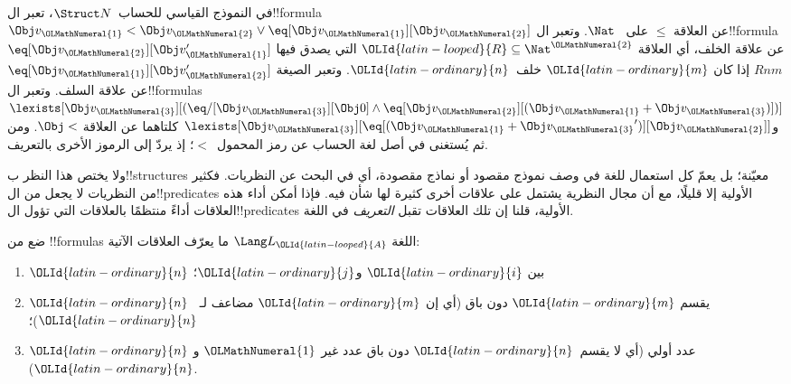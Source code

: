 \documentclass[../../../include/open-logic-section]{subfiles}
\begin{document}
\begin{ex}
في النموذج القياسي للحساب~$\Struct N$، تعبر ال!!{formula} $\Obj
v_{\OLMathNumeral{1}} < \Obj v_{\OLMathNumeral{2}} \lor \eq[\Obj v_{\OLMathNumeral{1}}][\Obj v_{\OLMathNumeral{2}}]$ عن العلاقة $\le$ على
~$\Nat$. وتعبر ال!!{formula} $\eq[\Obj v_{\OLMathNumeral{2}}][\Obj v_{\OLMathNumeral{1}}']$ عن علاقة
الخلف، أي العلاقة ${\OLId{latin-looped}{R}} \subseteq \Nat^{\OLMathNumeral{2}}$ التي يصدق فيها $Rnm$ إذا كان
${\OLId{latin-ordinary}{m}}$ خلف~${\OLId{latin-ordinary}{n}}$. وتعبر الصيغة $\eq[\Obj v_{\OLMathNumeral{1}}][\Obj v_{\OLMathNumeral{2}}']$ عن علاقة السلف.
وتعبر ال!!{formula}s $\lexists[\Obj v_{\OLMathNumeral{3}}][(\eq/[\Obj v_{\OLMathNumeral{3}}][\Obj 0] \land
  \eq[\Obj v_{\OLMathNumeral{2}}][(\Obj v_{\OLMathNumeral{1}} + \Obj v_{\OLMathNumeral{3}})])]$ و$\lexists[\Obj
  v_{\OLMathNumeral{3}}][\eq[(\Obj v_{\OLMathNumeral{1}} + {\Obj v_{\OLMathNumeral{3}}}')][\Obj v_{\OLMathNumeral{2}}]]$ كلتاهما عن العلاقة
$\Obj <$. ومن ثم يُستغنى في أصل لغة الحساب عن رمز المحمول~$<$؛
إذ يردّ إلى الرموز الأخرى بالتعريف.
\end{ex}

\begin{explain}
ولا يختص هذا النظر ب!!{structure}s معيّنة؛ بل يعمّ كل استعمال
للغة في وصف نموذج مقصود أو نماذج مقصودة، أي في البحث عن النظريات.
فكثير من النظريات لا يجعل من ال!!{predicate}s الأولية إلا قليلًا،
مع أن مجال النظرية يشتمل على علاقات أخرى كثيرة لها شأن فيه.
فإذا أمكن أداء هذه العلاقات أداءً منتظمًا بالعلاقات التي تؤول
ال!!{predicate}s الأولية، قلنا إن تلك العلاقات تقبل
\emph{التعريف} في اللغة.
\end{explain}

\begin{prob}
ضع من !!{formula}s اللغة $\Lang L_{\OLId{latin-looped}{A}}$ ما يعرّف العلاقات الآتية:
\begin{enumerate}
\item ${\OLId{latin-ordinary}{n}}$ بين ${\OLId{latin-ordinary}{i}}$ و${\OLId{latin-ordinary}{j}}$؛
\item ${\OLId{latin-ordinary}{n}}$ يقسم ${\OLId{latin-ordinary}{m}}$ دون باق (أي إن ${\OLId{latin-ordinary}{m}}$ مضاعف لـ~${\OLId{latin-ordinary}{n}}$)؛
\item ${\OLId{latin-ordinary}{n}}$ عدد أولي (أي لا يقسم~${\OLId{latin-ordinary}{n}}$ دون باق عدد غير ${\OLMathNumeral{1}}$ و${\OLId{latin-ordinary}{n}}$).
\end{enumerate}
\end{prob}
\end{document}
